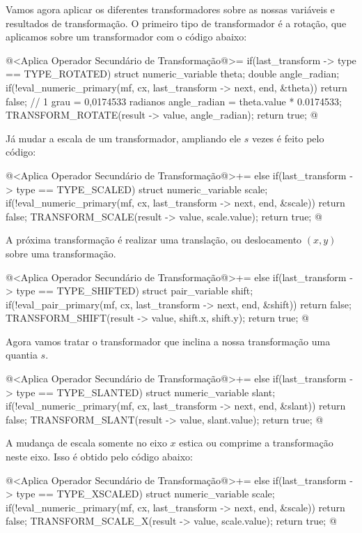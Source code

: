 Vamos agora aplicar os diferentes transformadores sobre as nossas
variáveis e resultados de transformação. O primeiro tipo de
transformador é a rotação, que aplicamos sobre um transformador com o
código abaixo:

\iniciocodigo
@<Aplica Operador Secundário de Transformação@>=
if(last_transform -> type == TYPE_ROTATED){ 
  struct numeric_variable theta;
  double angle_radian;
  if(!eval_numeric_primary(mf, cx, last_transform -> next, end, &theta))
    return false;
  // 1 grau = 0,0174533 radianos
  angle_radian = theta.value * 0.0174533;
  TRANSFORM_ROTATE(result -> value, angle_radian);
  return true;
}
@
\fimcodigo


Já mudar a escala de um transformador, ampliando ele $s$ vezes é feito
pelo código:

\iniciocodigo
@<Aplica Operador Secundário de Transformação@>+=
else if(last_transform -> type == TYPE_SCALED){
  struct numeric_variable scale;
  if(!eval_numeric_primary(mf, cx, last_transform -> next, end, &scale))
    return false;
  TRANSFORM_SCALE(result -> value, scale.value);
  return true;
}
@
\fimcodigo

A próxima transformação é realizar uma translação, ou deslocamento
$(x, y)$ sobre uma transformação.

\iniciocodigo
@<Aplica Operador Secundário de Transformação@>+=
else if(last_transform -> type == TYPE_SHIFTED){
  struct pair_variable shift;
  if(!eval_pair_primary(mf, cx, last_transform -> next, end, &shift))
    return false;
  TRANSFORM_SHIFT(result -> value, shift.x, shift.y);
  return true;
}
@
\fimcodigo

Agora vamos tratar o transformador que inclina a nossa transformação
uma quantia $s$.

\iniciocodigo
@<Aplica Operador Secundário de Transformação@>+=
else if(last_transform -> type == TYPE_SLANTED){
  struct numeric_variable slant;
  if(!eval_numeric_primary(mf, cx, last_transform -> next, end, &slant))
    return false;
  TRANSFORM_SLANT(result -> value, slant.value);
  return true;
}
@
\fimcodigo

A mudança de escala somente no eixo $x$ estica ou comprime a
transformação neste eixo. Isso é obtido pelo código abaixo:

\iniciocodigo
@<Aplica Operador Secundário de Transformação@>+=
else if(last_transform -> type == TYPE_XSCALED){
  struct numeric_variable scale;
  if(!eval_numeric_primary(mf, cx, last_transform -> next, end, &scale))
    return false;
  TRANSFORM_SCALE_X(result -> value, scale.value);
  return true;
}
@
\fimcodigo

